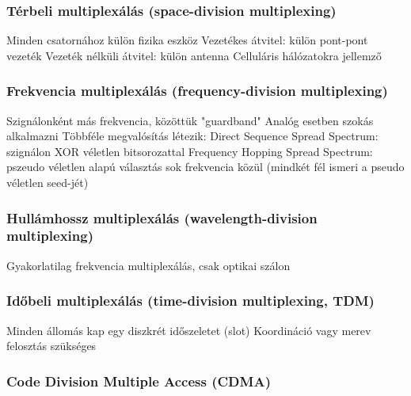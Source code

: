 \documentclass[12pt,a4paper]{article}
\begin{document}
\subsubsection{Térbeli multiplexálás (space-division multiplexing)}

\begin{outline}
	\1 Minden csatornához külön fizika eszköz
		\2 Vezetékes átvitel: külön pont-pont vezeték
		\2 Vezeték nélküli átvitel: külön antenna
	\1 Celluláris hálózatokra jellemző
\end{outline}

\subsubsection{Frekvencia multiplexálás (frequency-division multiplexing)}

\begin{outline}
	\1 Szignálonként más frekvencia, közöttük "guardband"
	\1 Analóg esetben szokás alkalmazni
	\1 Többféle megvalósítás létezik:
		\2 Direct Sequence Spread Spectrum: szignálon XOR véletlen bitsorozattal
		\2 Frequency Hopping Spread Spectrum: pszeudo véletlen alapú választás sok frekvencia közül (mindkét fél ismeri a pseudo véletlen seed-jét)
\end{outline}

\subsubsection{Hullámhossz multiplexálás (wavelength-division multiplexing)}

\begin{outline}
	\1 Gyakorlatilag frekvencia multiplexálás, csak optikai szálon
\end{outline}

\subsubsection{Időbeli multiplexálás (time-division multiplexing, TDM)}

\begin{outline}
	\1 Minden állomás kap egy diszkrét időszeletet (slot)
	\1 Koordináció vagy merev felosztás szükséges
\end{outline}

\pagebreak

\subsubsection{Code Division Multiple Access (CDMA)}
\end{document}
